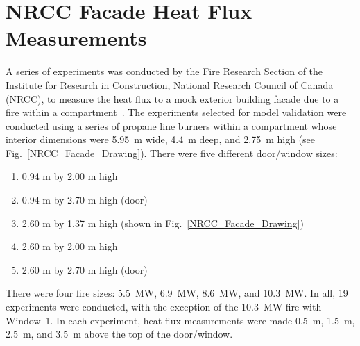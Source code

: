 \FloatBarrier

\section{NRCC Facade Heat Flux Measurements}
\label{NRCC_Facade_Description}

A series of experiments was conducted by the Fire Research Section of the Institute for Research in Construction, National Research Council of Canada (NRCC), to measure the heat flux to a mock exterior building facade due to a fire within a compartment~\cite{Oleszkiewicz:ASME,Oleszkiewicz:FireTech}. The experiments selected for model validation were conducted using a series of propane line burners within a compartment whose interior dimensions were 5.95~m wide, 4.4~m deep, and 2.75~m high (see Fig.~\ref{NRCC_Facade_Drawing}). There were five different door/window sizes:
\begin{enumerate}
\item 0.94 m by 2.00 m high
\item 0.94 m by 2.70 m high (door)
\item 2.60 m by 1.37 m high (shown in Fig.~\ref{NRCC_Facade_Drawing})
\item 2.60 m by 2.00 m high
\item 2.60 m by 2.70 m high (door)
\end{enumerate}
There were four fire sizes: 5.5~MW, 6.9~MW, 8.6~MW, and 10.3~MW. In all, 19 experiments were conducted, with the exception of the 10.3~MW fire with Window~1. In each experiment, heat flux measurements were made 0.5~m, 1.5~m, 2.5~m, and 3.5~m above the top of the door/window.

